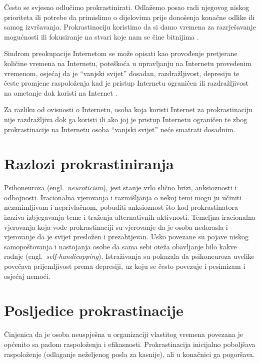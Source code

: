 \documentclass[11pt,twocolumn,english]{article}
\newcommand{\engl}[1]{(engl.~\emph{#1})}
\begin{document}
Često se svjesno odlučimo prokrastinirati. Odlažemo posao radi njegovog niskog
prioriteta ili potrebe da primislimo o dijelovima prije donošenja konačne odlike
ili samog izvršavanja. Prokrastinaciju koristimo da si damo vremena za
razrješavanje mogućnosti ili fokusiranje na stvari koje nam se čine bitnijima
\cite{burka2004procrastination}.

Sindrom preokupacije Internetom se može opisati kao provođenje pretjerane
količine vremena na Internetu, poteškoća u upravljanju na Internetu provedenim
vremenom, osjećaj da je ``vanjski svijet'' dosadan, razdražljivost, depresiju
te česte promjene raspoloženja kad je pristup Internetu ograničen ili
razdražljivost na ometanje dok koristi na Internet
\cite{yellowlees2007problematic}.
 
Za razliku od ovisnosti o Internetu, osoba koja koristi Internet za
prokrastinaciju nije razdražljiva dok ga koristi ili ako joj je pristup
Internetu ograničen te zbog prokrastinacije na Internetu osoba ``vanjski
svijet'' neće smatrati dosadnim.


\section{Razlozi prokrastiniranja}

Psihoneuroza \engl{neuroticism}, jest stanje vrlo slično brizi,
anksioznosti i odbojnosti. Iracionalna vjerovanja i razmišljanja o nekoj temi
mogu ju učiniti nezanimljivom i neprivlačnom, pobuditi anksioznost što kod
prokrastinatora izaziva izbjegavanja teme i traženja alternativnih aktivnosti.
Temeljna iracionalna vjerovanja koja vode prokrastinaciji su vjerovanje da je
osoba nedorasla i vjerovanje da je svijet presložen i prezahtjevan. Usko
povezane su pojave niskog samopoštovanja i nastojanja osobe da sama sebi oteža
obavljanje bilo kakve radnje \engl{self-handicapping}. Istraživanja
\cite{Caballero95neuro, Saklofske95neuro} su pokazala da psihoneuroza uvelike
povečava prijemljivost prema depresiji, uz koju se često povezuje i pesimizam i
osjećaj nemoći.



\section{Posljedice prokrastinacije}
Činjenica da je osoba neuspješna u organizaciji vlastitog vremena povezana je
općenito sa padom raspoloženja i efikasnosti. Prokrastinacija inicijalno
poboljšava raspoloženje (odlaganje neželjenog posla za kasnije), ali u
konačnici ga pogoršava.
\end{document}
